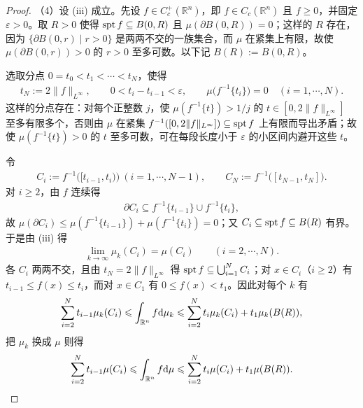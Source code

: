 \documentclass[../../main.tex]{subfiles}%
\begin{document}
\begin{proof}
（4）设 (iii) 成立。先设 $f\in C_c^+(\mathbb{R}^n)$，即 $f\in C_c(\mathbb{R}^n)$ 且 $f\geqslant0$，并固定 $\varepsilon>0$。取 $R>0$ 使得 $\operatorname{spt} f\subseteq B(0,R)$ 且 $\mu(\partial B(0,R))=0$；这样的 $R$ 存在，因为 $\{\partial B(0,r)\mid r>0\}$ 是两两不交的一族集合，而 $\mu$ 在紧集上有限，故使 $\mu(\partial B(0,r))>0$ 的 $r>0$ 至多可数。以下记 $B(R):=B(0,R)$。

选取分点 $0=t_0<t_1<\cdots<t_N$，使得
\begin{align*}
t_N:=2\lVert f\rVert_{L^\infty},\qquad 0<t_i-t_{i-1}<\varepsilon,\qquad \mu\bigl(f^{-1}\{t_i\}\bigr)=0\quad(i=1,\cdots,N).
\end{align*}
这样的分点存在：对每个正整数 $j$，使 $\mu(f^{-1}\{t\})>1/j$ 的 $t\in[0,2\lVert f\rVert_{L^\infty}]$ 至多有限多个，否则由 $\mu$ 在紧集 $f^{-1}([0,2\lVert f\rVert_{L^\infty}])\subseteq\operatorname{spt} f$ 上有限而导出矛盾；故使 $\mu(f^{-1}\{t\})>0$ 的 $t$ 至多可数，可在每段长度小于 $\varepsilon$ 的小区间内避开这些 $t$。

令
\begin{align*}
C_i:=f^{-1}\bigl([t_{i-1},t_i)\bigr)\ (i=1,\cdots,N-1),\qquad C_N:=f^{-1}\bigl([t_{N-1},t_N]\bigr).
\end{align*}
对 $i\geqslant2$，由 $f$ 连续得
\begin{align*}
\partial C_i\subseteq f^{-1}\{t_{i-1}\}\cup f^{-1}\{t_i\},
\end{align*}
故 $\mu(\partial C_i)\leqslant\mu(f^{-1}\{t_{i-1}\})+\mu(f^{-1}\{t_i\})=0$；又 $C_i\subseteq\operatorname{spt} f\subseteq B(R)$ 有界。于是由 (iii) 得
\begin{align*}
\lim_{k\to\infty}\mu_k(C_i)=\mu(C_i)\qquad(i=2,\cdots,N).
\end{align*}
各 $C_i$ 两两不交，且由 $t_N=2\lVert f\rVert_{L^\infty}$ 得 $\operatorname{spt} f\subseteq\bigcup_{i=1}^{N}C_i$；对 $x\in C_i$（$i\geqslant2$）有 $t_{i-1}\leqslant f(x)\leqslant t_i$，而对 $x\in C_1$ 有 $0\leqslant f(x)<t_1$。因此对每个 $k$ 有
\begin{align*}
\sum_{i=2}^{N}t_{i-1}\mu_k(C_i)\leqslant\int_{\mathbb{R}^n}f\mathrm{d}\mu_k\leqslant\sum_{i=2}^{N}t_i\mu_k(C_i)+t_1\mu_k(B(R)),
\end{align*}
把 $\mu_k$ 换成 $\mu$ 则得
\begin{align*}
\sum_{i=2}^{N}t_{i-1}\mu(C_i)\leqslant\int_{\mathbb{R}^n}f\mathrm{d}\mu\leqslant\sum_{i=2}^{N}t_i\mu(C_i)+t_1\mu(B(R)).
\end{align*}


\end{proof}
\end{document}
